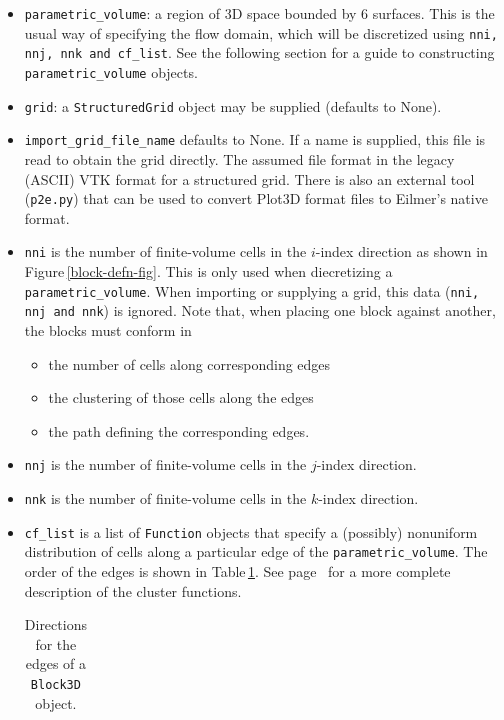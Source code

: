 \begin{itemize}
\item \texttt{parametric\_volume}: a region of 3D space bounded by 6 surfaces.
    This is the usual way of specifying the flow domain, which will be discretized 
    using \texttt{nni, nnj, nnk and cf\_list}.
    See the following section for a guide to constructing \texttt{parametric\_volume} objects.
\item \texttt{grid}: a \texttt{StructuredGrid} object may be supplied (defaults to None). 
\item \texttt{import\_grid\_file\_name} defaults to None.
  If a name is supplied, this file is read to obtain the grid directly.
  The assumed file format in the legacy (ASCII) VTK format for a structured grid.
  There is also an external tool (\texttt{p2e.py}) that can be used to convert
  Plot3D format files to Eilmer's native format.
\item \texttt{nni} is the number of finite-volume cells in the $i$-index
  direction as shown in Figure\,\ref{block-defn-fig}.
  This is only used when diecretizing a \texttt{parametric\_volume}.
  When importing or supplying a grid, this data (\texttt{nni, nnj and nnk}) is ignored.
  Note that, when placing one block against another, the blocks must conform in
  \begin{itemize}
    \item the number of cells along corresponding edges
    \item the clustering of those cells along the edges
    \item the path defining the corresponding edges.
  \end{itemize}
\item \texttt{nnj} is the number of finite-volume cells in the $j$-index direction.
\item \texttt{nnk} is the number of finite-volume cells in the $k$-index direction.
\item \texttt{cf\_list} is a list of \texttt{Function} objects
  that specify a (possibly) nonuniform distribution of cells along a
  particular edge of the \texttt{parametric\_volume}.
  The order of the edges is shown in Table\,\ref{edge-list-table}.
  See page~\pageref{cflist-item} for a more complete description of the cluster functions.
\begin{table}
  \caption{Directions for the edges of a \texttt{Block3D} object.}
  \label{edge-list-table}
  \begin{center}
    \begin{tabular}{cccl}

\end{tabular}
\end{center}
\end{table}
\end{itemize}
